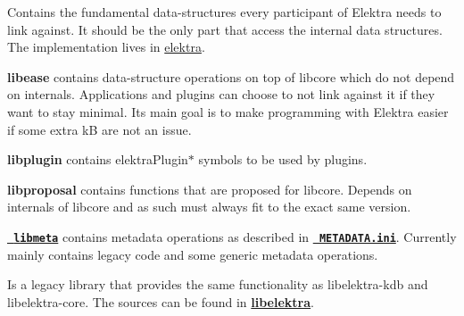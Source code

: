 Contains the fundamental data-\/structures every participant of Elektra needs to link against. It should be the only part that access the internal data structures. The implementation lives in \mbox{\hyperlink{md_src_libs_elektra_README_src_libs_elektra_README_md}{elektra}}.


\begin{DoxyCode}{0}
\end{DoxyCode}


{\bfseries{libease}} contains data-\/structure operations on top of libcore which do not depend on internals. Applications and plugins can choose to not link against it if they want to stay minimal. Its main goal is to make programming with Elektra easier if some extra kB are not an issue.


\begin{DoxyCode}{0}
\end{DoxyCode}


{\bfseries{libplugin}} contains {\ttfamily elektra\+Plugin$\ast$} symbols to be used by plugins.


\begin{DoxyCode}{0}
\end{DoxyCode}


{\bfseries{libproposal}} contains functions that are proposed for libcore. Depends on internals of libcore and as such must always fit to the exact same version.


\begin{DoxyCode}{0}
\end{DoxyCode}


{\bfseries{\href{/home/mpranj/workspace/libelektra/src/libs/meta/meta.c}{\texttt{ libmeta}}}} contains metadata operations as described in {\bfseries{\href{/home/mpranj/workspace/libelektra/doc/METADATA.ini}{\texttt{ M\+E\+T\+A\+D\+A\+T\+A.\+ini}}}}. Currently mainly contains legacy code and some generic metadata operations.

Is a legacy library that provides the same functionality as {\ttfamily libelektra-\/kdb} and {\ttfamily libelektra-\/core}. The sources can be found in {\bfseries{\mbox{\hyperlink{md_src_libs_elektra_README_src_libs_elektra_README_md}{libelektra}}}}.


\begin{DoxyCode}{0}
\end{DoxyCode}


